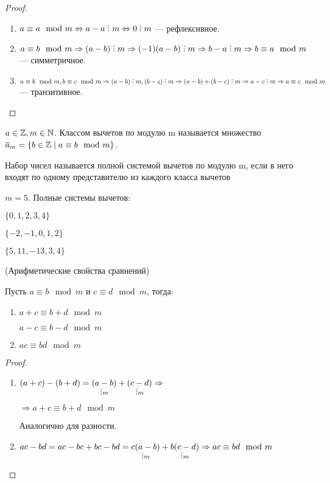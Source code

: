 \begin{proof}
  \begin{enumerate}
    \item $a \equiv a \mod m \Leftrightarrow a - a \divby m \Leftrightarrow 0 \divby m$ --- рефлексивное.
    \item $a \equiv b \mod m \Rightarrow (a - b) \divby m \Rightarrow (-1)(a - b) \divby m \Rightarrow b - a \divby m \Rightarrow b \equiv a \mod m$ --- симметричное.
    \item $a \equiv b \mod m, b \equiv c \mod m \Rightarrow (a - b) \divby m, (b - c) \divby m \Rightarrow (a - b) + (b - c) \divby m \Rightarrow a - c \divby m \Rightarrow a \equiv c \mod m$ --- транзитивное.
  \end{enumerate}
\end{proof}

\begin{definition}
  $a \in \mathbb{Z}, m \in \mathbb{N}$. Классом вычетов по модулю m называется множество $\overline{a}_m = \{b \in \mathbb{Z} \; | \; a \equiv b \mod m\}$.
\end{definition}

\begin{definition}
  Набор чисел называется полной системой вычетов по модулю m, если в него входят по одному представителю из каждого класса вычетов
\end{definition}

\begin{eg}
  $m = 5$. Полные системы вычетов:
  
  $\{0, 1, 2, 3, 4\}$

  $\{-2, -1, 0, 1, 2\}$

  $\{5, 11, -13, 3, 4\}$
\end{eg}

\begin{property} (Арифметические свойства сравнений)
  
  Пусть $a \equiv b \mod m$ и $c \equiv d \mod m$, тогда:
  \begin{enumerate}
    \item $a + c \equiv b + d \mod m$
    
    $a - c \equiv b - d \mod m$
    \item $ac \equiv bd \mod m$

  \end{enumerate}
\end{property}

\begin{proof}
  
  \begin{enumerate}
    \item $(a + c) - (b + d) = \underset{\divby m}{(a - b)} + \underset{\divby m}{(c - d)} \Rightarrow $
    
    $\Rightarrow a + c \equiv b + d \mod m$

    Аналогично для разности.
    \item $ac - bd = ac - bc + bc - bd = \underset{\divby m}{c(a - b)} + \underset{\divby m}{b(c - d)} \Rightarrow ac \equiv bd \mod m$
  \end{enumerate}
\end{proof}

